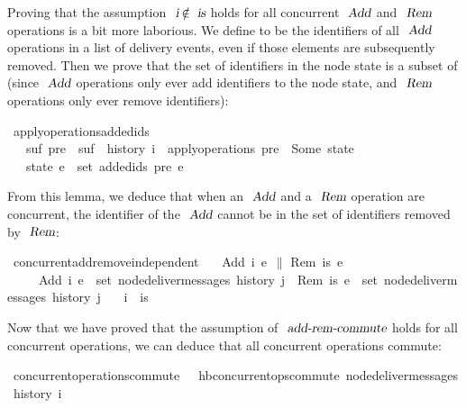 Proving that the assumption $\isa{i} \mathbin{\isasymnotin} \isa{is}$ holds for all concurrent $\isa{Add}$ and $\isa{Rem}$ operations is a bit more laborious.
We define  to be the identifiers of all $\isa{Add}$ operations in a list of delivery events, even if those elements are subsequently removed.
Then we prove that the set of identifiers in the node state is a subset of  (since $\isa{Add}$ operations only ever add identifiers to the node state, and $\isa{Rem}$ operations only ever remove identifiers):
\begin{isabelle}
\ apply{\isacharunderscore}operations{\isacharunderscore}added{\isacharunderscore}ids{\isacharcolon}\isanewline
\ \ \ {\isachardoublequoteopen}{\isasymexists}suf{\isachardot}\ pre\ {\isacharat}\ suf\ {\isacharequal}\ history\ i{\isachardoublequoteclose}\ \ {\isachardoublequoteopen}apply{\isacharunderscore}operations\ pre\ {\isacharequal}\ Some\ state{\isachardoublequoteclose}\isanewline
\ \ \ {\isachardoublequoteopen}state\ e\ {\isasymsubseteq}\ set\ {\isacharparenleft}added{\isacharunderscore}ids\ pre\ e{\isacharparenright}{\isachardoublequoteclose}
\end{isabelle}
\noindent From this lemma, we deduce that when an $\isa{Add}$ and a $\isa{Rem}$ operation are concurrent, the identifier of the $\isa{Add}$ cannot be in the set of identifiers removed by $\isa{Rem}$:
\begin{isabelle}
\ concurrent{\isacharunderscore}add{\isacharunderscore}remove{\isacharunderscore}independent{\isacharcolon}\isanewline
\ \ \ {\isachardoublequoteopen}{\isacharparenleft}Add\ i\ e{}{\isacharparenright}\ $\|$ {\isacharparenleft}Rem\ is\ e{}{\isacharparenright}{\isachardoublequoteclose}\ \isanewline
\ \ \ \ \ {\isachardoublequoteopen}Add\ i\ e{}\ {\isasymin}\ set\ {\isacharparenleft}node{\isacharunderscore}deliver{\isacharunderscore}messages\ {\isacharparenleft}history\ j{\isacharparenright}{\isacharparenright}{\isachardoublequoteclose}\ \ {\isachardoublequoteopen}Rem\ is\ e{}\ {\isasymin}\ set\ {\isacharparenleft}node{\isacharunderscore}deliver{\isacharunderscore}messages\ {\isacharparenleft}history\ j{\isacharparenright}{\isacharparenright}{\isachardoublequoteclose}\isanewline
\ \ \ {\isachardoublequoteopen}i\ {\isasymnotin}\ is{\isachardoublequoteclose}
\end{isabelle}
\noindent Now that we have proved that the assumption of $\isa{add-rem-commute}$ holds for all concurrent operations, we can deduce that all concurrent operations commute:
\begin{isabelle}
\ concurrent{\isacharunderscore}operations{\isacharunderscore}commute{\isacharcolon}\ \ \ {\isachardoublequoteopen}hb{\isachardot}concurrent{\isacharunderscore}ops{\isacharunderscore}commute\ {\isacharparenleft}node{\isacharunderscore}deliver{\isacharunderscore}messages\ {\isacharparenleft}history\ i{\isacharparenright}{\isacharparenright}{\isachardoublequoteclose}
\end{isabelle}

